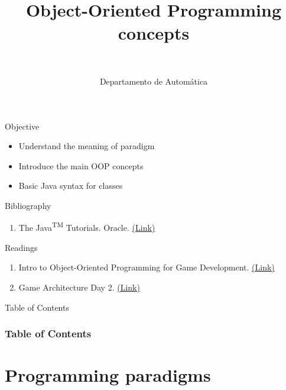 \documentclass[10pt,compress]{beamer} %
\title[OOP concepts]{Object-Oriented Programming concepts}
\author{\asignatura\\\carrera}
\institute{}
\date{Departamento de Automática}
\begin{document}
{\titlepageBlue
    \begin{frame}
        \titlepage
    \end{frame}
}

\institute{\asignatura}

\begin{frame}[plain]{}
   \begin{block}{Objective}
   \begin{itemize}
   		\item Understand the meaning of paradigm
   		\item Introduce the main OOP concepts
		\item Basic Java syntax for classes
	\end{itemize}
	\end{block}

   \begin{block}{Bibliography}
      \begin{enumerate}
          \item The Java\textsuperscript{TM} Tutorials. Oracle. \href{https://docs.oracle.com/javase/tutorial/}{(Link)}
      \end{enumerate} 
   \end{block}

   \begin{block}{Readings}
      \begin{enumerate}
          \item Intro to Object-Oriented Programming for Game Development. \href{https://gamedevelopment.tutsplus.com/tutorials/quick-tip-intro-to-object-oriented-programming-for-game-development--gamedev-1805}{(Link)}
          \item Game Architecture Day 2. \href{http://blog.nuclex-games.com/2010/01/game-architecture-day-2/}{(Link)}
      \end{enumerate} 
   \end{block}
\end{frame}

{
\begin{frame}[shrink]{Table of Contents}
 \frametitle{Table of Contents}
 \tableofcontents
\end{frame}
}

\section[Programming paradigms]{Programming paradigms}
\end{document}
